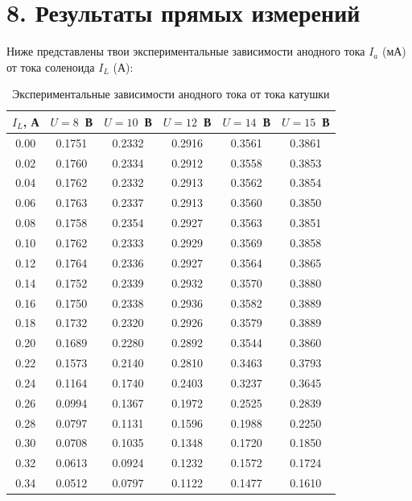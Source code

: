\documentclass[a4paper,12pt]{article}
\begin{document}
\section*{\hspace{30pt}8. Результаты прямых измерений}
\hspace{15pt} Ниже представлены твои экспериментальные зависимости анодного тока $I_a$ (мА) от тока соленоида $I_L$ (А):
\begin{longtable}{|c|c|c|c|c|c|}
    \caption{Экспериментальные зависимости анодного тока от тока катушки} \label{tab:raw_data} \\
    \hline
    $I_L$, А & $U = 8$~В & $U = 10$~В & $U = 12$~В & $U = 14$~В & $U = 15$~В \\ \hline
    0.00 & 0.1751 & 0.2332 & 0.2916 & 0.3561 & 0.3861 \\ \hline
    0.02 & 0.1760 & 0.2334 & 0.2912 & 0.3558 & 0.3853 \\ \hline
    0.04 & 0.1762 & 0.2332 & 0.2913 & 0.3562 & 0.3854 \\ \hline
    0.06 & 0.1763 & 0.2337 & 0.2913 & 0.3560 & 0.3850 \\ \hline
    0.08 & 0.1758 & 0.2354 & 0.2927 & 0.3563 & 0.3851 \\ \hline
    0.10 & 0.1762 & 0.2333 & 0.2929 & 0.3569 & 0.3858 \\ \hline
    0.12 & 0.1764 & 0.2336 & 0.2927 & 0.3564 & 0.3865 \\ \hline
    0.14 & 0.1752 & 0.2339 & 0.2932 & 0.3570 & 0.3880 \\ \hline
    0.16 & 0.1750 & 0.2338 & 0.2936 & 0.3582 & 0.3889 \\ \hline
    0.18 & 0.1732 & 0.2320 & 0.2926 & 0.3579 & 0.3889 \\ \hline
    0.20 & 0.1689 & 0.2280 & 0.2892 & 0.3544 & 0.3860 \\ \hline
    0.22 & 0.1573 & 0.2140 & 0.2810 & 0.3463 & 0.3793 \\ \hline
    0.24 & 0.1164 & 0.1740 & 0.2403 & 0.3237 & 0.3645 \\ \hline
    0.26 & 0.0994 & 0.1367 & 0.1972 & 0.2525 & 0.2839 \\ \hline
    0.28 & 0.0797 & 0.1131 & 0.1596 & 0.1988 & 0.2250 \\ \hline
    0.30 & 0.0708 & 0.1035 & 0.1348 & 0.1720 & 0.1850 \\ \hline
    0.32 & 0.0613 & 0.0924 & 0.1232 & 0.1572 & 0.1724 \\ \hline
    0.34 & 0.0512 & 0.0797 & 0.1122 & 0.1477 & 0.1610 \\ \hline

\end{longtable}
\end{document}
